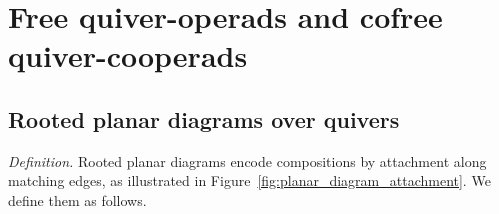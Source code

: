 \documentclass[11pt,letterpaper]{article}
\numberwithin{equation}{section}
\theoremstyle{plain}
\theoremstyle{definition}
\theoremstyle{remark}
\begin{document}
\section{Free quiver-operads and cofree quiver-cooperads}
\label{s_rooted_planar_diagram}

\subsection{Rooted planar diagrams over quivers}
\label{ss_rooted_planar_diagram}
\label{s_correspondence_tree_diagram}
\label{sss_gluing_planar_diagram}
\label{s_canonical_order}
\noindent\textit{Definition.}
Rooted planar diagrams encode compositions by attachment along
matching edges, as illustrated in Figure~\ref{fig:planar_diagram_attachment}.
We define them as follows.
\end{document}
